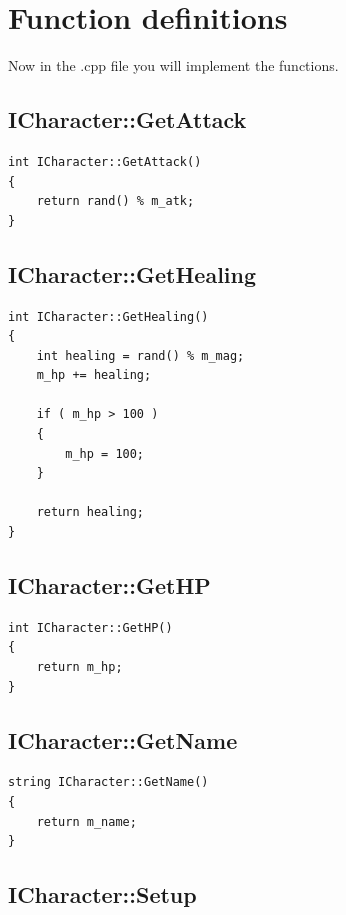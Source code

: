 \documentclass[a4paper,12pt,oneside]{book}
\begin{document}
    \newpage{}
    
    \section{Function definitions}

    Now in the .cpp file you will implement the functions.

    \subsection{ICharacter::GetAttack}

\begin{lstlisting}[style=code]
int ICharacter::GetAttack()
{
    return rand() % m_atk;
}
\end{lstlisting}

    \subsection{ICharacter::GetHealing}

\begin{lstlisting}[style=code]
int ICharacter::GetHealing()
{
    int healing = rand() % m_mag;
    m_hp += healing;

    if ( m_hp > 100 )
    {
        m_hp = 100;
    }

    return healing;
}
\end{lstlisting}

    \subsection{ICharacter::GetHP}

\begin{lstlisting}[style=code]
int ICharacter::GetHP()
{
    return m_hp;
}
\end{lstlisting}

    \subsection{ICharacter::GetName}

\begin{lstlisting}[style=code]
string ICharacter::GetName()
{
    return m_name;
}
\end{lstlisting}

    \subsection{ICharacter::Setup}
\end{document}
